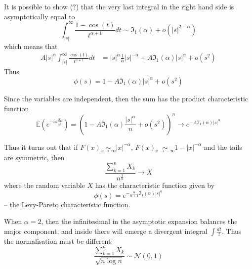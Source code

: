 \documentclass[a4paper]{article}
\newcommand{\brac}[1]{{\left ( #1 \right )}}
\newcommand{\abs}[1]{{\left | #1 \right |}}
\newcommand{\Ical}{\mathfrak{I}}
\newcommand{\ex}{\mathbb{E}}
\begin{document}
It is possible to show (?) that the very last integral in the right hand side is asymptotically equal to
\[\int_\abs{s}^\infty \frac{1-\cos(t)}{t^{\alpha+1}}dt \sim \Ical_1(\alpha) + o(\abs{s}^{2-\alpha})\]
which means that
\begin{align*}
A \abs{s}^\alpha \int_\abs{s}^\infty \frac{\cos(t)}{t^{\alpha+1}}dt
&= \abs{s}^\alpha \frac{1}{\alpha} \abs{s}^{-\alpha} + A \Ical_1(\alpha)\abs{s}^\alpha + o(s^2)
\end{align*}
Thus
\[\phi(s) = 1 - A \Ical_1(\alpha) \abs{s}^\alpha + o(s^2)\]

Since the variables are independent, then the sum has the product characteristic function
\[\ex\brac{ e^{-is\frac{S_n}{n^\frac{1}{\alpha}}} }
= \brac{1 - A \Ical_1(\alpha) \frac{\abs{s}^\alpha}{n} + o(s^2)}^n \to e^{-A \Ical_1(\alpha)\abs{s}^\alpha}\]

Thus it turns out that if $F(x)\underset{x\to\infty}{\sim} \abs{x}^{-\alpha}$,
$F(x)\underset{x\to-\infty}{\sim} 1-\abs{x}^{-\alpha}$ and the tails are symmetric,
then
\[\frac{\sum_{k=1}^{n}X_k}{n^\frac{1}{\alpha}}\to X\]
where the random variable $X$ has the characteristic function given by
\[\phi(s) = e^{-\frac{\alpha}{\alpha+1} \Ical_1(\alpha)\abs{s}^\alpha}\]
-- the Levy-Pareto characteristic function.

When $\alpha=2$, then the infinitesimal in the asymptotic expansion balances the major component, and inside there will emerge a divergent integral $\int \frac{dt}{t}$.
Thus the normalisation must be different:
\[\frac{\sum_{k=1}^n X_k}{\sqrt{n\log n}}\sim \mathcal{N}(0,1)\]
\end{document}
